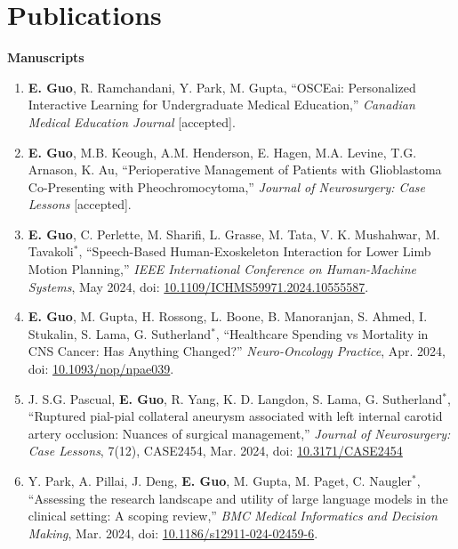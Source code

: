\documentclass{article}
\begin{document}
\section*{\textcolor{my_colour}{Publications}}
\vspace{-.25em} \hrulefill \vspace{.25em}

\textbf{Manuscripts} \vspace{.5em}

\begin{enumerate}
    \item \textbf{E. Guo}, R. Ramchandani, Y. Park, M. Gupta, ``OSCEai: Personalized Interactive Learning for Undergraduate Medical Education,'' \textit{Canadian Medical Education Journal} [accepted].
    \item \textbf{E. Guo}, M.B. Keough, A.M. Henderson, E. Hagen, M.A. Levine, T.G. Arnason, K. Au, ``Perioperative Management of Patients with Glioblastoma Co-Presenting with Pheochromocytoma,'' \textit{Journal of Neurosurgery: Case Lessons} [accepted].
    \item \textbf{E. Guo}, C. Perlette, M. Sharifi, L. Grasse, M. Tata, V. K. Mushahwar, M. Tavakoli$^*$, ``Speech-Based Human-Exoskeleton Interaction for Lower Limb Motion Planning,''  \textit{IEEE International Conference on Human-Machine Systems}, May 2024, doi: \href{https://doi.org/10.1109/ICHMS59971.2024.10555587}{10.1109/ICHMS59971.2024.10555587}.
    \item \textbf{E. Guo}, M. Gupta, H. Rossong, L. Boone, B. Manoranjan, S. Ahmed, I. Stukalin, S. Lama, G. Sutherland$^*$, ``Healthcare Spending vs Mortality in CNS Cancer: Has Anything Changed?'' \textit{Neuro-Oncology Practice}, Apr. 2024, doi: \href{https://doi.org/10.1093/nop/npae039}{10.1093/nop/npae039}.
    \item J. S.G. Pascual, \textbf{E. Guo}, R. Yang, K. D. Langdon, S. Lama, G. Sutherland$^*$, ``Ruptured pial-pial collateral aneurysm associated with left internal carotid artery occlusion: Nuances of surgical management,'' \textit{Journal of Neurosurgery: Case Lessons}, 7(12), CASE2454, Mar. 2024, doi: \href{https://doi.org/10.3171/CASE2454}{10.3171/CASE2454}
    \item Y. Park, A. Pillai, J. Deng, \textbf{E. Guo}, M. Gupta, M. Paget, C. Naugler$^*$, ``Assessing the research landscape and utility of large language models in the clinical setting: A scoping review,'' \textit{BMC Medical Informatics and Decision Making}, Mar. 2024, doi: \href{https://doi.org/10.1186/s12911-024-02459-6}{10.1186/s12911-024-02459-6}.

\end{enumerate}
\end{document}

